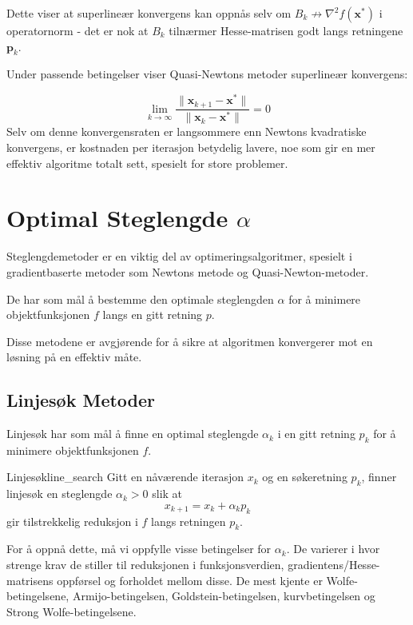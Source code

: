Dette viser at superlineær konvergens kan oppnås selv om \( B_k \not\to \nabla^2 f(\symbf{x}^\ast) \) i operatornorm - det er nok at \( B_k \) tilnærmer Hesse-matrisen godt langs retningene \( \symbf{p}_k \).

Under passende betingelser viser Quasi-Newtons metoder superlineær konvergens:

\[
	\lim_{k \to \infty} \frac{\|\symbf{x}_{k+1} - \symbf{x}^\ast\|}{\|\symbf{x}_k - \symbf{x}^\ast\|} = 0
\]
Selv om denne konvergensraten er langsommere enn Newtons kvadratiske konvergens, er kostnaden per iterasjon betydelig lavere, noe som gir en mer effektiv algoritme totalt sett, spesielt for store problemer.

\chapter{Optimal Steglengde \texorpdfstring{\(\alpha\)}{alpha}}
\label{chap:step_length_methods}
Steglengdemetoder er en viktig del av optimeringsalgoritmer, spesielt i gradientbaserte metoder som Newtons metode og Quasi-Newton-metoder.

De har som mål å bestemme den optimale steglengden \(\alpha\) for å minimere objektfunksjonen \(f\) langs en gitt retning \(p\).

Disse metodene er avgjørende for å sikre at algoritmen konvergerer mot en løsning på en effektiv måte.

\section{Linjesøk Metoder}
Linjesøk har som mål å finne en optimal steglengde \(\alpha_k\) i en gitt retning \(p_k\) for å minimere objektfunksjonen \(f\).

\begin{definition}{Linjesøk}{line_search}
	Gitt en nåværende iterasjon \(x_k\) og en søkeretning \(p_k\), finner linjesøk en steglengde \(\alpha_k > 0\) slik at
	\[
		x_{k+1} = x_k + \alpha_k p_k
	\]
	gir tilstrekkelig reduksjon i \(f\) langs retningen \(p_k\).
\end{definition}

For å oppnå dette, må vi oppfylle visse betingelser for \(\alpha_k\).
De varierer i hvor strenge krav de stiller til reduksjonen i funksjonsverdien, gradientens/Hesse-matrisens oppførsel og forholdet mellom disse.
De mest kjente er Wolfe-betingelsene, Armijo-betingelsen, Goldstein-betingelsen, kurvbetingelsen og Strong Wolfe-betingelsene.

